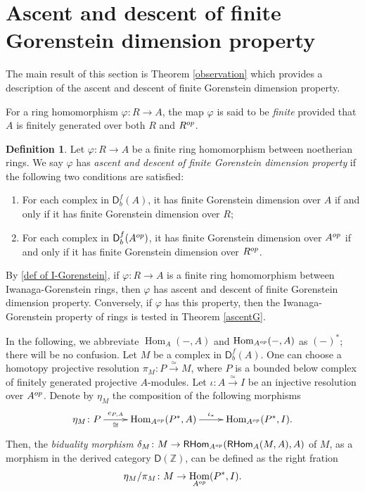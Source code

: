 \documentclass{amsart}
\newcommand{\Z}{\mathbb{Z}}
\newcommand{\D}{\mathsf{D}}
\newcommand{\0}{{\bf{0}}}
\DeclareMathOperator{\Hom}{Hom}
\DeclareMathOperator{\RHom}{\mathsf{RHom}}
\theoremstyle{definition}
\newtheorem{definition}[theorem]{Definition}
\begin{document}
\section{Ascent and descent of finite Gorenstein dimension property}\label{sectionadfd}
The main result of this section is Theorem \ref{observation} which provides a description of the ascent and descent of finite Gorenstein dimension property. %

For a ring homomorphism $\varphi\colon R\rightarrow A$, the map $\varphi$ is said to be \emph{finite} provided that $A$ is finitely generated over both $R$ and $R^{\rm op}$.


\begin{definition}\label{def:ADfGd}
Let $\varphi\colon R\rightarrow A$ be a finite ring homomorphism between noetherian rings.
We say $\varphi$ has \emph{ascent and descent of finite Gorenstein dimension property} if the following two conditions are satisfied$\colon$
\begin{enumerate}
\item For each complex in $\D^f_b(A)$, it has finite Gorenstein dimension over $A$  if and only if it has finite Gorenstein dimension over $R$;

\item For each complex in $\D^f_b(A^{\rm op})$, it has finite Gorenstein dimension over $A^{\rm op}$  if and only if it has finite Gorenstein dimension over $R^{\rm op}$.
\end{enumerate}
\end{definition}



By \ref{def of I-Gorenstein}, if $\varphi\colon R\rightarrow A$ is a finite ring homomorphism between Iwanaga-Gorenstein rings, then $\varphi$ has ascent and descent of finite Gorenstein dimension property.
Conversely, if $\varphi$ has this property, then the Iwanaga-Gorenstein property of rings is tested in Theorem \ref{ascentG}.


In the following, we abbreviate $\Hom_A(-,A)$ and $\Hom_{A^{\rm op}}(-,A)$ as $(-)^\ast$; there will be no confusion. Let $M$ be a complex in $\D^f_b(A)$. One can choose a homotopy projective resolution $\pi_M\colon P\xrightarrow \simeq M$, where $P$ is a bounded below complex of finitely generated projective  $A$-modules. Let $\iota\colon A\xrightarrow \simeq I$ be an injective resolution over $A^{\rm op}$. Denote by $\eta_M$ the composition of the following morphisms
$$
\xymatrix{
\eta_M\colon P \ar[r]^-{{\rm e}_{P,A}}_-\cong & \Hom_{A^{\rm op}}(P^\ast,A)\ar[r]^-{\iota_\ast}& \Hom_{A^{\rm op}}(P^\ast,I).
}
$$
Then, the \emph{biduality morphism} $\delta_M\colon M\rightarrow \RHom_{A^{\rm op}}(\RHom_A(M,A),A)$ of $M$, as a morphism in the derived category $\D(\Z)$, can be defined as the right fration
$$
\eta_M/\pi_M\colon M\rightarrow \Hom_{A^{\rm op}}(P^\ast,I).
$$
\end{document}
